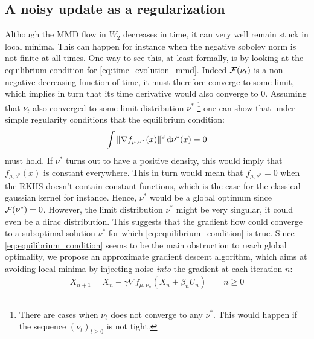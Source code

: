 

\subsection{A noisy update as a regularization}\label{sec:noisy_flow}

Although the MMD flow in $W_2$ decreases in time, it can very well
 remain stuck in local minima. This can happen for instance when the negative sobolev norm is not finite at all times. One way to see this, at least formally, is by looking at the equilibrium condition for \cref{eq:time_evolution_mmd}.
Indeed ${{\mathcal F}}(\nu_t)$ is a non-negative decreasing function of time, it must therefore converge to some limit, which implies in turn that its time derivative would also converge to $0$. Assuming that $\nu_t$ also converged to some limit distribution $\nu^{*}$
\footnote{There are cases when $\nu_t$ does not converge to any $\nu^*$. This would happen if the sequence $(\nu_t)_{t\geq 0}$ is not tight.} 
one can show that under simple regularity conditions  that the equilibrium condition:
\begin{align}\label{eq:equilibrium_condition}
	\int \Vert \nabla f_{\mu,\nu^{*}}(x)\Vert^2 \mathop{}\!\mathrm{d} \nu^{*}(x) =0  
\end{align}
must hold. If $\nu^*$ turns out to have a positive density, this would imply that $f_{\mu,\nu^{*}}(x)$ is constant everywhere. This in turn would mean that $f_{\mu,\nu^{*}}=0$ when the RKHS doesn't contain constant functions, which is the case for the classical gaussian kernel for instance. Hence, $\nu^*$ would be a global optimum since ${{\mathcal F}}(\nu^{*})=0$. However, the limit distribution $\nu^*$  might be very singular, it could even be a dirac distribution.   This suggests that the gradient flow could converge to a suboptimal solution $\nu^*$ for which \cref{eq:equilibrium_condition} is true. 
Since \cref{eq:equilibrium_condition} seems to be the main obstruction to reach global optimality, we propose an approximate gradient descent algorithm, which aims at avoiding local minima by injecting noise \textit{into} the gradient at each iteration $n$:  
\begin{align}\label{eq:discretized_noisy_flow}
	X_{n+1} = X_{n} -\gamma \nabla f_{\mu,\nu_n}(X_n+ \beta_n U_n) \qquad n\geq 0
\end{align}
